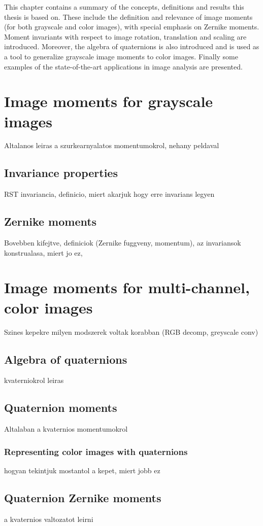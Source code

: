 This chapter contains a summary of the concepts, definitions and results this thesis is based on. These include the definition and relevance of image moments (for both grayscale and color images), with special emphasis on Zernike moments. Moment invariants with respect to image rotation, translation and scaling are introduced.
Moreover, the algebra of quaternions is also introduced and is used as a tool to generalize grayscale image moments to color images.
Finally some examples of the state-of-the-art applications in image analysis are presented.

\section{Image moments for grayscale images}
Altalanos leiras a szurkearnyalatos momentumokrol, nehany peldaval
\subsection{Invariance properties}
RST invariancia, definicio, miert akarjuk hogy erre invarians legyen
\subsection{Zernike moments}
Bovebben kifejtve, definiciok (Zernike fuggveny, momentum), az invariansok konstrualasa, miert jo ez,


\section{Image moments for multi-channel, color images}
Szines kepekre milyen modszerek voltak korabban (RGB decomp, greyscale conv)

\subsection{Algebra of quaternions}
kvaterniokrol leiras

\subsection{Quaternion moments}
Altalaban a kvaternios momentumokrol
\subsubsection{Representing color images with quaternions}
hogyan tekintjuk mostantol a kepet, miert jobb ez

\subsection{Quaternion Zernike moments}
a kvaternios valtozatot leirni
